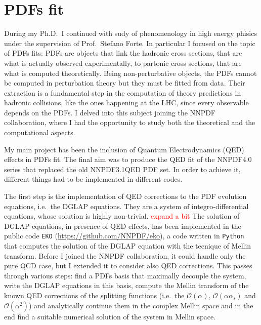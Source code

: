 \documentclass[11pt,a4paper]{moderncv}        %
\begin{document}
\section{PDFs fit}

During my Ph.D.\ I continued with sudy of phenomenology in high energy phisics under the supervision of Prof.\ Stefano Forte.
In particular I focused on the topic of PDFs fits: PDFs are objects that link the hadronic cross sections,
that are what is actually observed experimentally, to partonic cross sections, that are what is computed theoretically.
Being non-perturbative objects, the PDFs cannot be computed in perturbation theory but they must be fitted from data.
Their extraction is a fundamental step in the computation of theory predictions in hadronic collisions, like the ones happening 
at the LHC, since every observable depends on the PDFs.
I delved into this subject joining the NNPDF collaboration, where I had the opportunity to study both the theoretical and the
computational aspects.

My main project has been the inclusion of Quantum Electrodynamics (QED) effects in PDFs fit.
The final aim was to produce the QED fit of the NNPDF4.0 series that replaced the old NNPDF3.1QED PDF set.
In order to achieve it, different things had to be implemented in different codes.

The first step is the implementation of QED corrections to the PDF evolution equations, i.e.\ the DGLAP equations.
They are a system of integro-differential equations, whose solution is highly non-trivial. \textcolor{red}{expand a bit}
The solution of DGLAP equations, in presence of QED effects, has been implemented in the public code \texttt{EKO}
(\url{https://github.com/NNPDF/eko}), a code written in \texttt{Python} that computes the solution of the DGLAP equation with the
tecnique of Mellin transform.
Before I joined the NNPDF collaboration, it could handle only the pure QCD case, but I extended it to consider also QED corrections.
This passes through various steps: find a PDFs basis that maximally decouple the system, write the DGLAP equations in this basis,
compute the Mellin transform of the known QED corrections of the splitting functions
(i.e.\ the $\mathcal{O}(\alpha)$, $\mathcal{O}(\alpha \alpha_s)$ and $\mathcal{O}(\alpha^2)$) and analytically continue them in the complex Mellin space
and in the end find a suitable numerical solution of the system in Mellin space.
\end{document}
